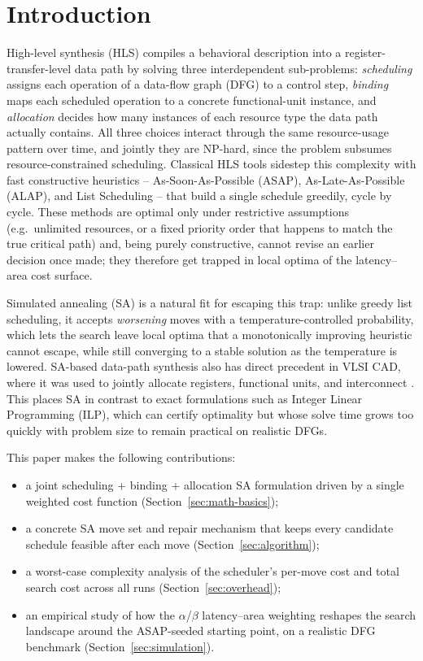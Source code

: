 \documentclass[conference]{IEEEtran}
\begin{document}
    \section{Introduction}
    \label{sec:introduction}

    High-level synthesis (HLS) compiles a behavioral description into a register-transfer-level
    data path by solving three interdependent sub-problems: \emph{scheduling} assigns each
    operation of a data-flow graph (DFG) to a control step, \emph{binding} maps each scheduled
    operation to a concrete functional-unit instance, and \emph{allocation} decides how many
    instances of each resource type the data path actually contains. All three choices interact
    through the same resource-usage pattern over time, and jointly they are NP-hard, since the
    problem subsumes resource-constrained scheduling. Classical HLS tools sidestep this
    complexity with fast constructive heuristics -- As-Soon-As-Possible (ASAP), As-Late-As-Possible
    (ALAP), and List Scheduling -- that build a single schedule greedily, cycle by cycle. These
    methods are optimal only under restrictive assumptions (e.g.\ unlimited resources, or a fixed
    priority order that happens to match the true critical path) and, being purely constructive,
    cannot revise an earlier decision once made; they therefore get trapped in local optima of the
    latency--area cost surface.

    Simulated annealing (SA) is a natural fit for escaping this trap: unlike greedy list
    scheduling, it accepts \emph{worsening} moves with a temperature-controlled probability, which
    lets the search leave local optima that a monotonically improving heuristic cannot escape, while
    still converging to a stable solution as the temperature is lowered. SA-based data-path synthesis
    also has direct precedent in VLSI CAD, where it was used to jointly allocate registers,
    functional units, and interconnect \cite{Devadas1989}. This places SA in contrast to exact
    formulations such as Integer Linear Programming (ILP), which can certify optimality but whose
    solve time grows too quickly with problem size to remain practical on realistic DFGs.

    This paper makes the following contributions:
    \begin{itemize}
        \item a joint scheduling + binding + allocation SA formulation driven by a single weighted
        cost function (Section~\ref{sec:math-basics});
        \item a concrete SA move set and repair mechanism that keeps every candidate schedule
        feasible after each move (Section~\ref{sec:algorithm});
        \item a worst-case complexity analysis of the scheduler's per-move cost and total
        search cost across all runs (Section~\ref{sec:overhead});
        \item an empirical study of how the $\alpha$/$\beta$ latency--area weighting reshapes the
        search landscape around the ASAP-seeded starting point, on a realistic DFG benchmark
        (Section~\ref{sec:simulation}).
    \end{itemize}
\end{document}
